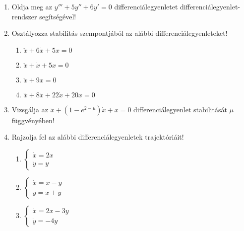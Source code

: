 \documentclass{szb-practice}
\begin{document}
\begin{enumerate}
  \item Oldja meg az $y''' + 5y'' + 6y' = 0$ differenciálegyenletet
        differenciálegyenlet-rendszer segítségével!

  \item Osztályozza stabilitás szempontjából az alábbi differenciálegyenleteket!
        \begin{multicols}{2}
          \begin{enumerate}
            \item $
                    \ddot x + 6 \dot x + 5x = 0
                  $

            \item $
                    \ddot x + \dot x + 5x = 0
                  $

            \item $
                    \ddot x + 9x = 0
                  $

            \item $
                    \dddot x + 8\ddot x + 22\dot x + 20x = 0
                  $
          \end{enumerate}
        \end{multicols}

  \item Vizsgálja az $\ddot x + (1 - e^{2 - \mu}) \dot x + x = 0$
        differenciálegyenlet stabilitását $\mu$ függvényében!

  \item Rajzolja fel az alábbi differenciálegyenletek trajektóriáit!
        \begin{multicols}{3}
          \begin{enumerate}
            \item $
                    \left\{
                    \begin{array}{l}
                      \dot x = 2x \\
                      \dot y = y
                    \end{array}
                    \right.
                  $

            \item $
                    \left\{
                    \begin{array}{l}
                      \dot x = x - y \\
                      \dot y = x + y
                    \end{array}
                    \right.
                  $

            \item $
                    \left\{
                    \begin{array}{l}
                      \dot x = 2x - 3y \\
                      \dot y = -4y
                    \end{array}
                    \right.
                  $
          \end{enumerate}
        \end{multicols}
\end{enumerate}
\end{document}
